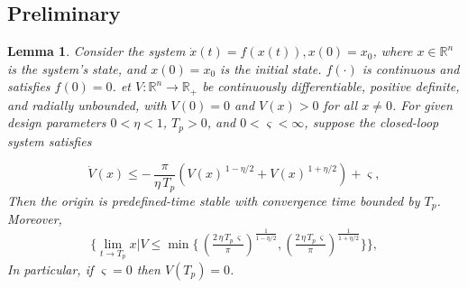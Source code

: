 \documentclass[pdflatex,sn-mathphys-num]{sn-jnl}%
\theoremstyle{thmstyleone}%
\newtheorem{lemma}{Lemma}
\newtheorem{assumption}{Assumption}
\theoremstyle{thmstyletwo}%
\theoremstyle{thmstylethree}%
\begin{document}





\subsection{Preliminary}


\begin{lemma} \label{lemma:1}\cite{WangEtAl_2022_Adaptivefuzzy} Consider the system $
	\dot{x}(t) = f(x(t)), x(0) = x_0
$, where $x \in \mathbb{R}^n$ is the system's state, and $x(0) = x_0$ is the initial state. $f(\cdot)$ is continuous and satisfies $f(0) = 0$. et $V:\mathbb{R}^n\to\mathbb{R}_+$ be continuously differentiable, positive definite, and radially unbounded, with $V(0)=0$ and $V(x)>0$ for all $x\neq 0$.
For given design parameters $0<\eta<1$, $T_p>0$, and $0<\varsigma<\infty$, suppose the closed-loop system satisfies
			  
\begin{equation}	\label{eq:7}
	\dot V(x) \le
	-\,\frac{\pi}{\eta\,T_p}\left(V(x)^{\,1-{\eta}/{2}}+V(x)^{\,1+{\eta}/{2}}\right)
	+\varsigma,
\end{equation}
Then the origin is predefined-time stable with convergence time bounded by $T_p$. Moreover,
\begin{equation}\label{eq:8}
	\Biggl\{ \lim_{t\to T_p} x|V
	\le
	\min\!\Biggl\{\,
	\left(\tfrac{2\,\eta\,T_p\,\varsigma}{\pi}\right)^{\frac{1}{1-{\eta}/{2}}}\!,
	\left(\tfrac{2\,\eta\,T_p\,\varsigma}{\pi}\right)^{\frac{1}{1+{\eta}/{2}}}
	\Biggr\} \Biggr\},
\end{equation}
In particular, if $\varsigma=0$ then $V(T_p)=0$.
\end{lemma}
\end{document}
